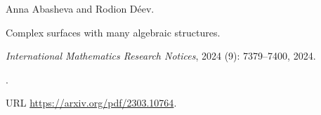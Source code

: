 Anna Abasheva and Rodion D{\'e}ev.

\newblock Complex surfaces with many algebraic structures.

\newblock \emph{International Mathematics Research Notices}, 2024
  (9): 7379--7400, 2024.

\newblock {}.

\newblock URL \url{https://arxiv.org/pdf/2303.10764}.
